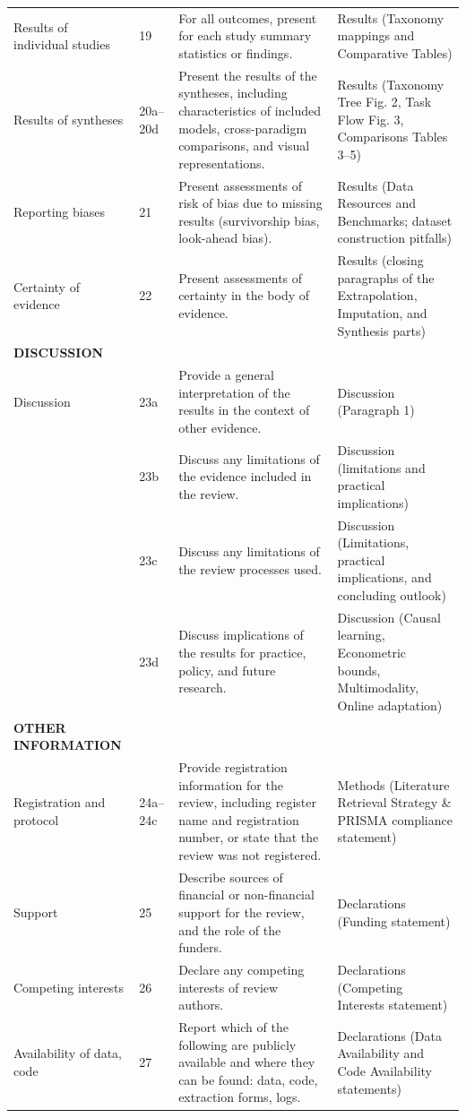 \documentclass[10pt,a4paper]{article}
\begin{document}
\begin{longtable}{p{2.2cm} p{1.2cm} p{8.5cm} p{4.0cm}}
Results of individual studies & 19 & For all outcomes, present for each study summary statistics or findings. & Results (Taxonomy mappings and Comparative Tables) \\
Results of syntheses & 20a--20d & Present the results of the syntheses, including characteristics of included models, cross-paradigm comparisons, and visual representations. & Results (Taxonomy Tree Fig. 2, Task Flow Fig. 3, Comparisons Tables 3--5) \\
Reporting biases & 21 & Present assessments of risk of bias due to missing results (survivorship bias, look-ahead bias). & Results (Data Resources and Benchmarks; dataset construction pitfalls) \\
Certainty of evidence & 22 & Present assessments of certainty in the body of evidence. & Results (closing paragraphs of the Extrapolation, Imputation, and Synthesis parts) \\
\midrule
\textbf{DISCUSSION} & & & \\
Discussion & 23a & Provide a general interpretation of the results in the context of other evidence. & Discussion (Paragraph 1) \\
& 23b & Discuss any limitations of the evidence included in the review. & Discussion (limitations and practical implications) \\
& 23c & Discuss any limitations of the review processes used. & Discussion (Limitations, practical implications, and concluding outlook) \\
& 23d & Discuss implications of the results for practice, policy, and future research. & Discussion (Causal learning, Econometric bounds, Multimodality, Online adaptation) \\
\midrule
\textbf{OTHER INFORMATION} & & & \\
Registration and protocol & 24a--24c & Provide registration information for the review, including register name and registration number, or state that the review was not registered. & Methods (Literature Retrieval Strategy \& PRISMA compliance statement) \\
Support & 25 & Describe sources of financial or non-financial support for the review, and the role of the funders. & Declarations (Funding statement) \\
Competing interests & 26 & Declare any competing interests of review authors. & Declarations (Competing Interests statement) \\
Availability of data, code & 27 & Report which of the following are publicly available and where they can be found: data, code, extraction forms, logs. & Declarations (Data Availability and Code Availability statements) \\
\end{longtable}
\end{document}
